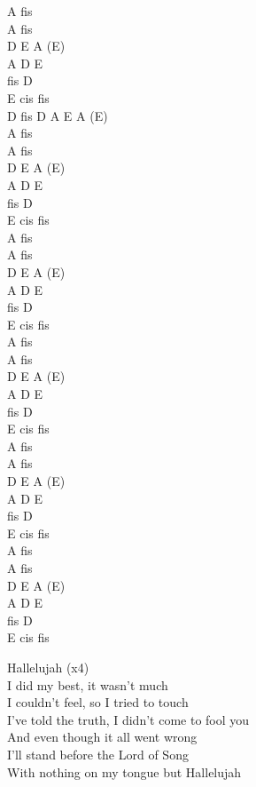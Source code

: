 \documentclass[a5paper, 10pt]{book}
\begin{document}
\begin{minipage}[t]{0.2\textwidth}
  A fis\\
  A fis\\
  D E A (E)\\
  A D E\\
  fis D\\
  E cis fis\\

  D fis D A E A (E)\\

  A fis\\
  A fis\\
  D E A (E)\\
  A D E\\
  fis D\\
  E cis fis\\

  A fis\\
  A fis\\
  D E A (E)\\
  A D E\\
  fis D\\
  E cis fis\\

  A fis\\
  A fis\\
  D E A (E)\\
  A D E\\
  fis D\\
  E cis fis\\

  A fis\\
  A fis\\
  D E A (E)\\
  A D E\\
  fis D\\
  E cis fis\\

  A fis\\
  A fis\\
  D E A (E)\\
  A D E\\
  fis D\\
  E cis fis\\
\end{minipage}
\newpage
\begin{minipage}[t]{0.8\textwidth}

  \hspace*{6mm}Hallelujah (x4)\\

  I did my best, it wasn't much\\
  I couldn't feel, so I tried to touch\\
  I've told the truth, I didn't come to fool you\\
  And even though it all went wrong\\
  I'll stand before the Lord of Song\\
  With nothing on my tongue but Hallelujah\\
\end{minipage}
\end{document}
